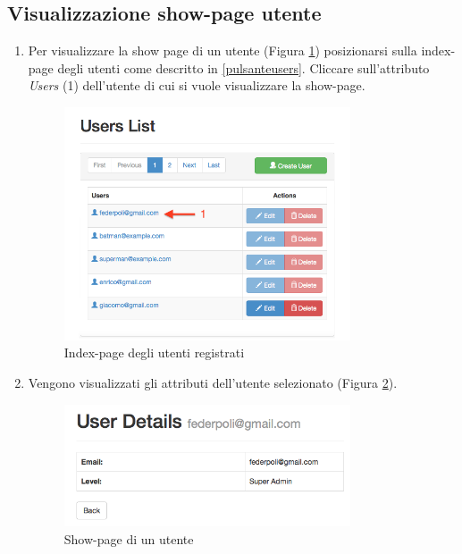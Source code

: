 	\subsection{Visualizzazione show-page utente} %
	\label{utenti-visualizzazione}
		\begin{enumerate}

			\item Per visualizzare la show page di un utente (Figura \ref{fig:usersEmailButton}) posizionarsi sulla index-page degli utenti come descritto in \ref{pulsanteusers}. Cliccare sull'attributo \emph{Users} (1) dell'utente di cui si vuole visualizzare la show-page.

				\begin{figure}[H]
					\centering \includegraphics[width=0.8\textwidth]{img/usersEmailButton.png}
					\caption{ \label{fig:usersEmailButton} Index-page degli utenti registrati}
				\end{figure}

			\item Vengono visualizzati gli attributi dell'utente selezionato (Figura \ref{fig:userShowPage}).

				\begin{figure}[H]
					\centering \includegraphics[width=0.8\textwidth]{img/userShowPage.png}
					\caption{ \label{fig:userShowPage} Show-page di un utente}
				\end{figure}

		\end{enumerate}

